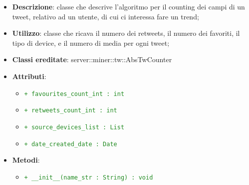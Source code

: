 			\begin{itemize}
				\item \textbf{Descrizione}: classe che descrive l'algoritmo per il counting dei campi di un tweet, relativo ad un utente, di cui ci interessa fare un trend;
				\item \textbf{Utilizzo}: classe che ricava il numero dei retweets, il numero dei favoriti, il tipo di device, e il numero di media per ogni tweet;
				\item \textbf{Classi ereditate}: server::miner::tw::AbsTwCounter
				\item \textbf{Attributi}:    
					\begin{itemize}
						\item \textcolor{forestgreen}{\texttt{+ favourites\_count\_int : int}}
						\item \textcolor{forestgreen}{\texttt{+ retweets\_count\_int : int}}
						\item \textcolor{forestgreen}{\texttt{+ source\_devices\_list : List}}
						\item \textcolor{forestgreen}{\texttt{+ date\_created\_date : Date}}
					\end{itemize}
				\item \textbf{Metodi}:  
					\begin{itemize}
						\item \textcolor{forestgreen}{\texttt{+ \_\_init\_\_(name\_str : String) : void}}
						\begin{description}

\end{description}
\end{itemize}
\end{itemize}
